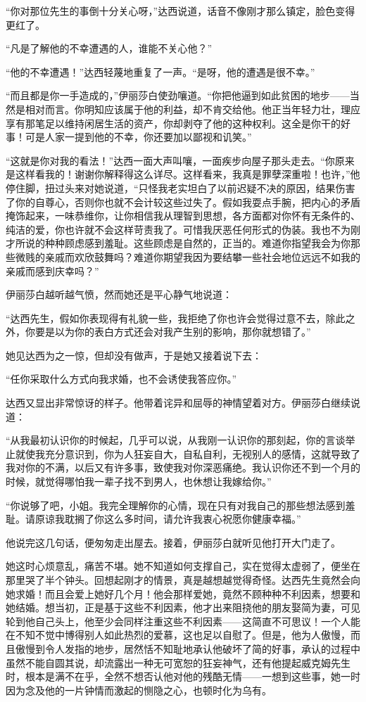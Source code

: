 \par “你对那位先生的事倒十分关心呀，”达西说道，话音不像刚才那么镇定，脸色变得更红了。
\par “凡是了解他的不幸遭遇的人，谁能不关心他？”
\par “他的不幸遭遇！”达西轻蔑地重复了一声。“是呀，他的遭遇是很不幸。”
\par “而且都是你一手造成的，”伊丽莎白使劲嚷道。“你把他逼到如此贫困的地步——当然是相对而言。你明知应该属于他的利益，却不肯交给他。他正当年轻力壮，理应享有那笔足以维持闲居生活的资产，你却剥夺了他的这种权利。这全是你干的好事！可是人家一提到他的不幸，你还要加以鄙视和讥笑。”
\par “这就是你对我的看法！”达西一面大声叫嚷，一面疾步向屋子那头走去。“你原来是这样看我的！谢谢你解释得这么详尽。这样看来，我真是罪孽深重啦！也许，”他停住脚，扭过头来对她说道，“只怪我老实坦白了以前迟疑不决的原因，结果伤害了你的自尊心，否则你也就不会计较这些过失了。假如我耍点手腕，把内心的矛盾掩饰起来，一味恭维你，让你相信我从理智到思想，各方面都对你怀有无条件的、纯洁的爱，你也许就不会这样苛责我了。可惜我厌恶任何形式的伪装。我也不为刚才所说的种种顾虑感到羞耻。这些顾虑是自然的，正当的。难道你指望我会为你那些微贱的亲戚而欢欣鼓舞吗？难道你期望我因为要结攀一些社会地位远远不如我的亲戚而感到庆幸吗？”
\par 伊丽莎白越听越气愤，然而她还是平心静气地说道：
\par “达西先生，假如你表现得有礼貌一些，我拒绝了你也许会觉得过意不去，除此之外，你要是以为你的表白方式还会对我产生别的影响，那你就想错了。”
\par 她见达西为之一惊，但却没有做声，于是她又接着说下去：
\par “任你采取什么方式向我求婚，也不会诱使我答应你。”
\par 达西又显出非常惊讶的样子。他带着诧异和屈辱的神情望着对方。伊丽莎白继续说道：
\par “从我最初认识你的时候起，几乎可以说，从我刚一认识你的那刻起，你的言谈举止就使我充分意识到，你为人狂妄自大，自私自利，无视别人的感情，这就导致了我对你的不满，以后又有许多事，致使我对你深恶痛绝。我认识你还不到一个月的时候，就觉得哪怕我一辈子找不到男人，也休想让我嫁给你。”
\par “你说够了吧，小姐。我完全理解你的心情，现在只有对我自己的那些想法感到羞耻。请原谅我耽搁了你这么多时间，请允许我衷心祝愿你健康幸福。”
\par 他说完这几句话，便匆匆走出屋去。接着，伊丽莎白就听见他打开大门走了。
\par 她这时心烦意乱，痛苦不堪。她不知道如何支撑自己，实在觉得太虚弱了，便坐在那里哭了半个钟头。回想起刚才的情景，真是越想越觉得奇怪。达西先生竟然会向她求婚！而且会爱上她好几个月！他会那样爱她，竟然不顾种种不利因素，想要和她结婚。想当初，正是基于这些不利因素，他才出来阻挠他的朋友娶简为妻，可见轮到他自己头上，他至少会同样注重这些不利因素——这简直不可思议！一个人能在不知不觉中博得别人如此热烈的爱慕，这也足以自慰了。但是，他为人傲慢，而且傲慢到令人发指的地步，居然恬不知耻地承认他破坏了简的好事，承认的过程中虽然不能自圆其说，却流露出一种无可宽恕的狂妄神气，还有他提起威克姆先生时，根本是满不在乎，全然不想否认他对他的残酷无情——一想到这些事，她一时因为念及他的一片钟情而激起的恻隐之心，也顿时化为乌有。
